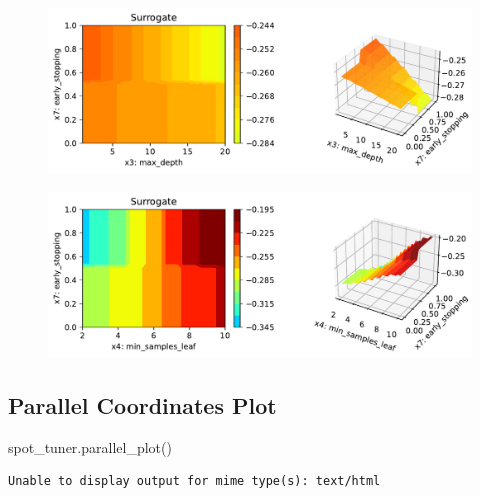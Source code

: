 \documentclass[
  letterpaper,
  DIV=11,
  numbers=noendperiod]{scrreprt}
\newenvironment{Shaded}{\begin{snugshade}}{\end{snugshade}}
\newcommand{\NormalTok}[1]{\textcolor[rgb]{0.00,0.23,0.31}{#1}}
\begin{document}
\begin{figure}[H]

{\centering \includegraphics{17_spot_hpt_sklearn_multiclass_classification_xgb_files/figure-pdf/cell-47-output-6.pdf}

}

\end{figure}

\begin{figure}[H]

{\centering \includegraphics{17_spot_hpt_sklearn_multiclass_classification_xgb_files/figure-pdf/cell-47-output-7.pdf}

}

\end{figure}

\hypertarget{parallel-coordinates-plot-2}{%
\subsection{Parallel Coordinates
Plot}\label{parallel-coordinates-plot-2}}

\begin{Shaded}
\begin{Highlighting}[]
\NormalTok{spot\_tuner.parallel\_plot()}
\end{Highlighting}
\end{Shaded}

\begin{verbatim}
Unable to display output for mime type(s): text/html
\end{verbatim}
\end{document}
